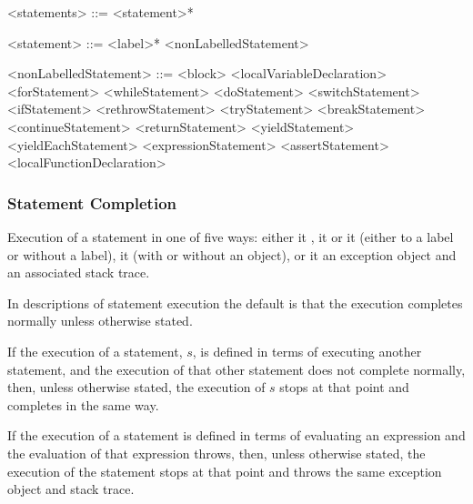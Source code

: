\documentclass[makeidx]{article}
\begin{document}
{\begin{grammar}
<statements> ::= <statement>*

<statement> ::= <label>* <nonLabelledStatement>

<nonLabelledStatement> ::= <block>
  \alt <localVariableDeclaration>
  \alt <forStatement>
  \alt <whileStatement>
  \alt <doStatement>
  \alt <switchStatement>
  \alt <ifStatement>
  \alt <rethrowStatement>
  \alt <tryStatement>
  \alt <breakStatement>
  \alt <continueStatement>
  \alt <returnStatement>
  \alt <yieldStatement>
  \alt <yieldEachStatement>
  \alt <expressionStatement>
  \alt <assertStatement>
  \alt <localFunctionDeclaration>
\end{grammar}


\subsubsection{Statement Completion}

\LMHash{}%
Execution of a statement 
in one of five ways:
either it
,
it 
or it 
(either to a label or without a label),
it  (with or without an object),
or it 
an exception object and an associated stack trace.

\LMHash{}%
In descriptions of statement execution the default is that
the execution completes normally unless otherwise stated.

\LMHash{}%
If the execution of a statement, $s$,
is defined in terms of executing another statement,
and the execution of that other statement does not complete normally,
then, unless otherwise stated, the execution of $s$ stops
at that point and completes in the same way.

\LMHash{}%
If the execution of a statement is defined in terms of evaluating an expression
and the evaluation of that expression throws,
then, unless otherwise stated, the execution of the statement stops
at that point and throws the same exception object and stack trace.

}
\end{document}
